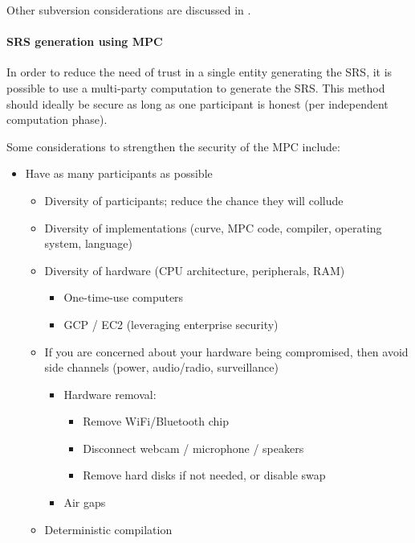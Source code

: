 Other subversion considerations are discussed in .


\paragraph{SRS generation using MPC}
In order to reduce the need of trust in a single entity generating the SRS, it is possible to use a multi-party computation to generate the SRS. 
This method should ideally be secure as long as one participant is honest (per independent computation phase). 



Some considerations to strengthen the security of the MPC include:
\begin{itemize}
    \item Have as many participants as possible
	\begin{itemize}
        \item Diversity of participants; reduce the chance they will collude
        \item Diversity of implementations (curve, MPC code, compiler, operating system, language)
        \item Diversity of hardware (CPU architecture, peripherals, RAM)
		\begin{itemize}
            \item One-time-use computers
            \item GCP / EC2 (leveraging enterprise security)
		\end{itemize}
        \item If you are concerned about your hardware being compromised, then avoid side channels (power, audio/radio, surveillance)
        \begin{itemize}
			\item Hardware removal:
			\begin{itemize}
                \item Remove WiFi/Bluetooth chip
                \item Disconnect webcam / microphone / speakers
                \item Remove hard disks if not needed, or disable swap
				\end{itemize}
            \item Air gaps
		\end{itemize}
    \item Deterministic compilation

\end{itemize}
\end{itemize}
